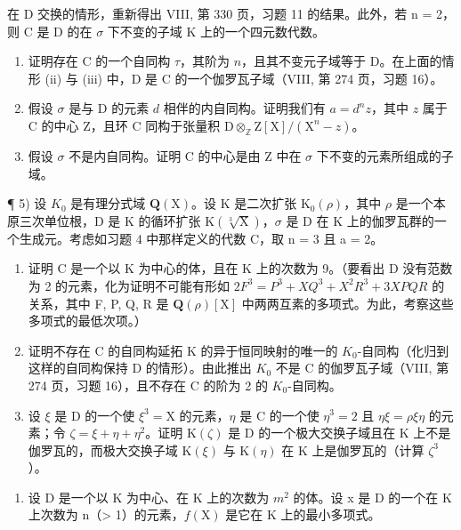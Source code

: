 在 D 交换的情形，重新得出 VIII, 第 330 页，习题 11 的结果。此外，若 n = 2，则 C 是 D 的在 \(\sigma\) 下不变的子域 K 上的一个四元数代数。

\begin{enumerate}
\def\labelenumi{\alph{enumi})}
\setcounter{enumi}{3}
\item
  证明存在 C 的一个自同构 \(\tau\)，其阶为 \(n\)，且其不变元子域等于 D。在上面的情形 (ii) 与 (iii) 中，D 是 C 的一个伽罗瓦子域（VIII, 第 274 页，习题 16）。
\item
  假设 \(\sigma\) 是与 D 的元素 \(d\) 相伴的内自同构。证明我们有 \(a = d^n z\)，其中 \(z\) 属于 C 的中心 Z，且环 C 同构于张量积 \(\mathrm{D} \otimes_{\mathbb{Z}} \mathrm{Z}[\mathrm{X}] / (\mathrm{X}^n - z)\)。
\item
  假设 \(\sigma\) 不是内自同构。证明 C 的中心是由 Z 中在 \(\sigma\) 下不变的元素所组成的子域。
\end{enumerate}

¶ 5) 设 \(K_{0}\) 是有理分式域 \(\mathbf{Q}(\mathrm{X})\)。设 K 是二次扩张 \(\mathrm{K}_{0}(\rho)\)，其中 \(\rho\) 是一个本原三次单位根，D 是 K 的循环扩张 \(\mathrm{K}(\sqrt[3]{\mathrm{X}})\)，\(\sigma\) 是 D 在 K 上的伽罗瓦群的一个生成元。考虑如习题 4 中那样定义的代数 C，取 n = 3 且 a = 2。

\begin{enumerate}
\def\labelenumi{\alph{enumi})}
\item
  证明 C 是一个以 K 为中心的体，且在 K 上的次数为 9。（要看出 D 没有范数为 2 的元素，化为证明不可能有形如 \(2F^{3} = P^{3} + XQ^{3} + X^{2}R^{3} + 3XPQR\) 的关系，其中 F, P, Q, R 是 \(\mathbf{Q}(\rho)[\mathrm{X}]\) 中两两互素的多项式。为此，考察这些多项式的最低次项。）
\item
  证明不存在 C 的自同构延拓 K 的异于恒同映射的唯一的 \(K_{0}\)-自同构（化归到这样的自同构保持 D 的情形）。由此推出 \(K_{0}\) 不是 C 的伽罗瓦子域（VIII, 第 274 页，习题 16），且不存在 C 的阶为 2 的 \(K_{0}\)-自同构。
\item
  设 \(\xi\) 是 D 的一个使 \(\xi^3 = \mathrm{X}\) 的元素，\(\eta\) 是 C 的一个使 \(\eta^3 = 2\) 且 \(\eta \xi = \rho \xi \eta\) 的元素；令 \(\zeta = \xi + \eta + \eta^2\)。证明 \(\mathrm{K}(\zeta)\) 是 D 的一个极大交换子域且在 K 上不是伽罗瓦的，而极大交换子域 \(\mathrm{K}(\xi)\) 与 \(\mathrm{K}(\eta)\) 在 K 上是伽罗瓦的（计算 \(\zeta^3\)）。
\end{enumerate}

\begin{enumerate}
\def\labelenumi{\arabic{enumi})}
\setcounter{enumi}{5}
\tightlist
\item
  设 D 是一个以 K 为中心、在 K 上的次数为 \(m^{2}\) 的体。设 x 是 D 的一个在 K 上次数为 n（\textgreater{} 1）的元素，\(f(\mathrm{X})\) 是它在 K 上的最小多项式。
\end{enumerate}

